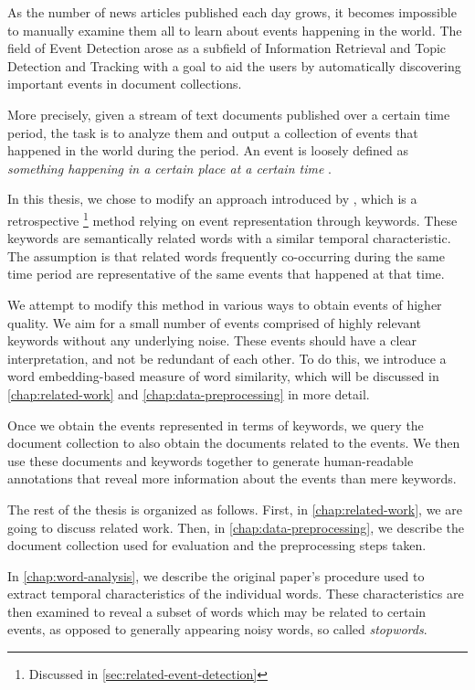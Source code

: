 As the number of news articles published each day grows, it becomes impossible to manually examine them all to learn about events happening in the world. The field of Event Detection arose as a subfield of Information Retrieval \citep{information-retrieval-2, information-retrieval} and Topic Detection and Tracking \citep{tdt, tdt-2} with a goal to aid the users by automatically discovering important events in document collections.

More precisely, given a stream of text documents published over a certain time period, the task is to analyze them and output a collection of events that happened in the world during the period. An event is loosely defined as \textit{something happening in a certain place at a certain time} \citep{retrospective-online-study}.

In this thesis, we chose to modify an approach introduced by \cite{event-detection}, which is a retrospective \footnote{Discussed in \autoref{sec:related-event-detection}} method relying on event representation through keywords. These keywords are semantically related words with a similar temporal characteristic. The assumption is that related words frequently co-occurring during the same time period are representative of the same events that happened at that time.

We attempt to modify this method in various ways to obtain events of higher quality. We aim for a small number of events comprised of highly relevant keywords without any underlying noise. These events should have a clear interpretation, and not be redundant of each other. To do this, we introduce a word embedding-based measure of word similarity, which will be discussed in \autoref{chap:related-work} and \autoref{chap:data-preprocessing} in more detail.

Once we obtain the events represented in terms of keywords, we query the document collection to also obtain the documents related to the events. We then use these documents and keywords together to generate human-readable annotations that reveal more information about the events than mere keywords.

The rest of the thesis is organized as follows. First, in \autoref{chap:related-work}, we are going to discuss related work. Then, in \autoref{chap:data-preprocessing}, we describe the document collection used for evaluation and the preprocessing steps taken.

In \autoref{chap:word-analysis}, we describe the original paper's procedure used to extract temporal characteristics of the individual words. These characteristics are then examined to reveal a subset of words which may be related to certain events, as opposed to generally appearing noisy words, so called \textit{stopwords}.

